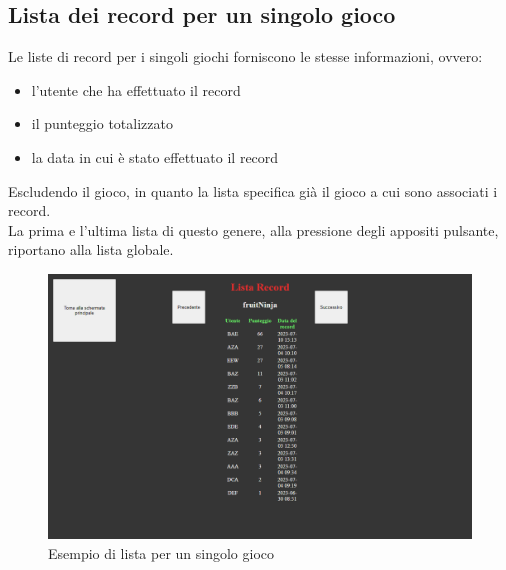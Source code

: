 \subsection{Lista dei record per un singolo gioco}
Le liste di record per i singoli giochi forniscono le stesse informazioni, ovvero:
\begin{itemize}
    \item l'utente che ha effettuato il record
    \item il punteggio totalizzato
    \item la data in cui è stato effettuato il record
\end{itemize}
Escludendo il gioco, in quanto la lista specifica già il gioco a cui sono associati i record.\\
La prima e l'ultima lista di questo genere, alla pressione degli appositi pulsante, riportano alla lista globale.
\begin{figure}[h]
    \centering
    \includegraphics[width=340pt]{schermataRecordSingoloGioco.png}
    \caption{Esempio di lista per un singolo gioco}
    \label{fig:schermataRecordSingoloGioco}
\end{figure}
\newpage
